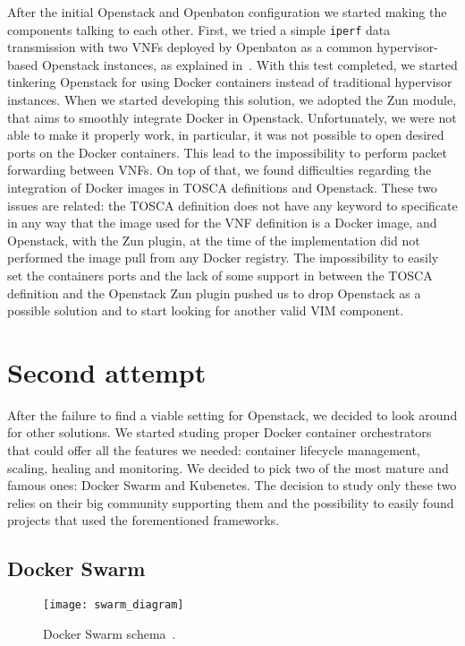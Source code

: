After the initial Openstack and Openbaton configuration we started making the
components talking to each other. First, we tried a simple \verb!iperf! data
transmission with two VNFs deployed by Openbaton as a common hypervisor-based
Openstack instances, as explained in~\cite{openbatonIperf}. With this test
completed, we started tinkering Openstack for using Docker containers instead of
traditional hypervisor instances. When we started developing this solution, we
adopted the Zun module, that aims to smoothly integrate Docker in Openstack.
Unfortunately, we were not able to make it properly work, in particular, it was
not possible to open desired ports on the Docker containers. This lead to the
impossibility to perform packet forwarding between VNFs. On top of that, we
found difficulties regarding the integration of Docker images in TOSCA
definitions and Openstack. These two issues are related: the TOSCA definition
does not have any keyword to specificate in any way that the image used for the
VNF definition is a Docker image, and Openstack, with the Zun plugin, at the
time of the implementation did not performed the image pull from any Docker
registry. The impossibility to easily set the containers ports and the lack of
some support in between the TOSCA definition and the Openstack Zun plugin pushed
us to drop Openstack as a possible solution and to start looking for another
valid VIM component.

\section{Second attempt}

After the failure to find a viable setting for Openstack, we decided to look
around for other solutions. We started studing proper Docker container
orchestrators that could offer all the features we needed: container lifecycle
management, scaling, healing and monitoring. We decided to pick two of the most
mature and famous ones: Docker Swarm and Kubenetes. The decision to study only
these two relies on their big community supporting them and the possibility to
easily found projects that used the forementioned frameworks.

\subsection{Docker Swarm}

\begin{figure}[t]
  \centering
  \texttt{[image: swarm\_diagram]}
  \caption[Docker Swarm schema]{Docker Swarm schema~\cite{dockerSwarmWiki}.}
  \label{chap:archimpl:sec:secondattempt:img:dockerswarm}
\end{figure}

